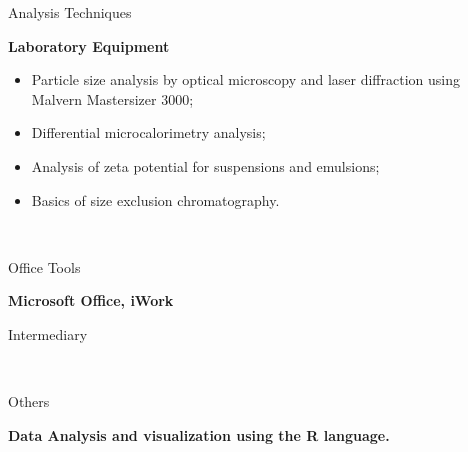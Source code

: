 \documentclass[a4paper, 12pt]{article}
\newcommand{\entry}[5]{
	\begin{minipage}[t]{.1\textwidth}
		\begin{flushright}
			\hfill
			{\textsc{#1}}

			{\textsc{#2}}
		\end{flushright}
	\end{minipage}
	\hfill\textcolor{Accent}{\vline}\hfill
	\begin{minipage}[t]{.80\textwidth}

		#3
		
		\textcolor{Accent}{\textbf{#4}}
		
		\footnotesize{#5}

	\end{minipage} \\ \vspace{.5cm}

}
\begin{document}
\renewcommand{\labelitemi}{\textendash}

\entry{}{}{Analysis Techniques}{Laboratory Equipment}{
	\begin{itemize}
		\item Particle size analysis by optical microscopy and laser diffraction using Malvern Mastersizer 3000;
		\item Differential microcalorimetry analysis;
		\item Analysis of zeta potential for suspensions and emulsions;
		\item Basics of size exclusion chromatography.	
	\end{itemize}}

\entry{}{}{Office Tools}{Microsoft Office, iWork}{Intermediary}

\entry{}{}{Others}{Data Analysis and visualization using the R language.}{}
\end{document}
